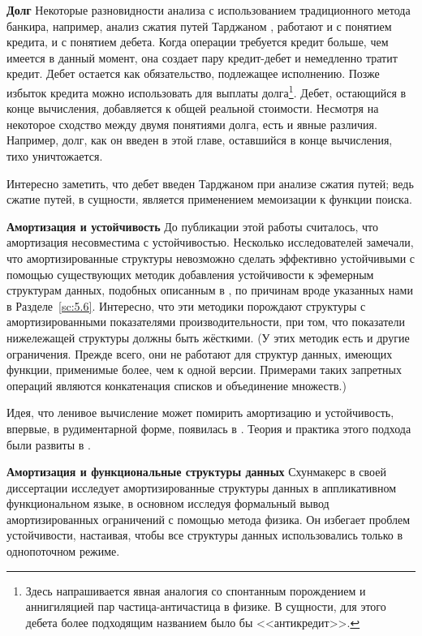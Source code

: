 \noindent
\textbf{Долг} Некоторые разновидности анализа с использованием
традиционного метода банкира, например, анализ сжатия путей Тарджаном
\cite{Tarjan1983}, работают и с понятием кредита, и с понятием
дебета.  Когда операции требуется кредит больше, чем имеется в данный
момент, она создает пару кредит-дебет и немедленно тратит
кредит. Дебет остается как обязательство, подлежащее исполнению. Позже
избыток кредита можно использовать для выплаты долга\footnote{Здесь
  напрашивается явная аналогия со спонтанным порождением и
  аннигиляцией пар частица-античастица в физике. В сущности, для этого
  дебета более подходящим названием было бы <<антикредит>>.
}.
Дебет, остающийся в конце вычисления, добавляется к общей реальной
стоимости. Несмотря на некоторое сходство между двумя понятиями долга,
есть и явные различия. Например, долг, как он введен в этой главе,
оставшийся в конце вычисления, тихо уничтожается.

Интересно заметить, что дебет введен Тарджаном при анализе сжатия
путей; ведь сжатие путей, в сущности, является применением мемоизации
к функции поиска.

\noindent
\textbf{Амортизация и устойчивость} До публикации этой работы
считалось, что амортизация несовместима с устойчивостью.  Несколько
исследователей \cite{DriscollSleatorTarjan1994, Raman1992} замечали,
что амортизированные структуры невозможно сделать эффективно
устойчивыми с помощью существующих методик добавления устойчивости к
эфемерным структурам данных, подобных описанным в
\cite{Driscolletal1989, Dietz1989}, по причинам вроде указанных нами в
Разделе~\ref{sc:5.6}. Интересно, что эти методики порождают структуры
с амортизированными показателями производительности, при том, что
показатели нижележащей структуры должны быть жёсткими. (У этих методик
есть и другие ограничения. Прежде всего, они не работают для структур
данных, имеющих функции, применимые более, чем к одной
версии. Примерами таких запретных операций являются конкатенация
списков и объединение множеств.)

Идея, что ленивое вычисление может помирить амортизацию и устойчивость,
впервые, в рудиментарной форме, появилась в
\cite{Okasaki1995c}. Теория и практика этого подхода были развиты в
\cite{Okasaki1995a, Okasaki1996b}.

\noindent
\textbf{Амортизация и функциональные структуры данных} Схунмакерс
\cite{Schoenmakers1993} в своей диссертации исследует амортизированные
структуры данных в аппликативном функциональном языке, в основном
исследуя формальный вывод амортизированных ограничений с помощью
метода физика. Он избегает проблем устойчивости, настаивая, чтобы все
структуры данных использовались только в однопоточном режиме.

